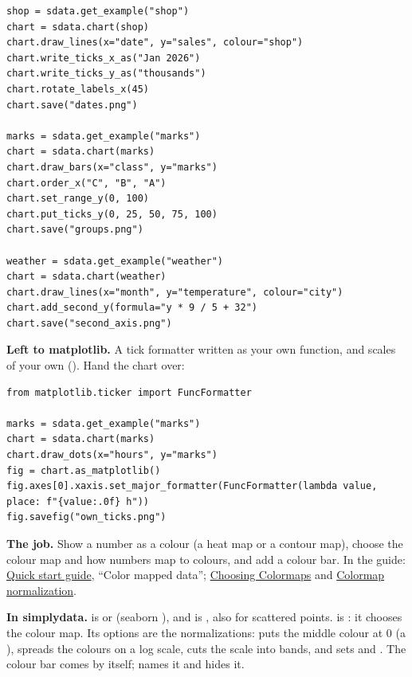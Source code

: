 \begin{lstlisting}[style=py]
shop = sdata.get_example("shop")
chart = sdata.chart(shop)
chart.draw_lines(x="date", y="sales", colour="shop")
chart.write_ticks_x_as("Jan 2026")
chart.write_ticks_y_as("thousands")
chart.rotate_labels_x(45)
chart.save("dates.png")

marks = sdata.get_example("marks")
chart = sdata.chart(marks)
chart.draw_bars(x="class", y="marks")
chart.order_x("C", "B", "A")
chart.set_range_y(0, 100)
chart.put_ticks_y(0, 25, 50, 75, 100)
chart.save("groups.png")

weather = sdata.get_example("weather")
chart = sdata.chart(weather)
chart.draw_lines(x="month", y="temperature", colour="city")
chart.add_second_y(formula="y * 9 / 5 + 32")
chart.save("second_axis.png")
\end{lstlisting}

\textbf{Left to matplotlib.} A tick formatter written as your own function, and scales of your own
(). Hand the chart over:

\begin{lstlisting}[style=py]
from matplotlib.ticker import FuncFormatter

marks = sdata.get_example("marks")
chart = sdata.chart(marks)
chart.draw_dots(x="hours", y="marks")
fig = chart.as_matplotlib()
fig.axes[0].xaxis.set_major_formatter(FuncFormatter(lambda value, place: f"{value:.0f} h"))
fig.savefig("own_ticks.png")
\end{lstlisting}


\textbf{The job.} Show a number as a colour (a heat map or a contour map), choose the colour map and
how numbers map to colours, and add a colour bar. In the guide:
\href{https://matplotlib.org/stable/users/explain/quick_start.html}{Quick start guide}, ``Color
mapped data''; \href{https://matplotlib.org/stable/users/explain/colors/colormaps.html}{Choosing
Colormaps} and \href{https://matplotlib.org/stable/users/explain/colors/colormapnorms.html}{Colormap
normalization}.

\textbf{In simplydata.}  is  or  (seaborn
), and  is , also for scattered points.
 is : it chooses the colour map. Its options are the
normalizations:  puts the middle colour at 0 (a ), 
spreads the colours on a log scale,  cuts the scale into bands, and  sets
 and . The colour bar comes by itself;  names it and
 hides it.

